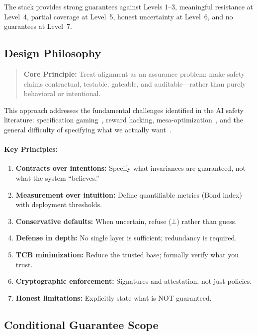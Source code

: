\documentclass[11pt,letterpaper]{article}
\theoremstyle{definition}
\theoremstyle{remark}
\begin{document}
The stack provides strong guarantees against Levels 1--3, meaningful resistance at Level~4, partial coverage at Level~5, honest uncertainty at Level~6, and no guarantees at Level~7.

\subsection{Design Philosophy}

\begin{quote}
\textbf{Core Principle:} Treat alignment as an assurance problem: make safety claims contractual, testable, gateable, and auditable---rather than purely behavioral or intentional.
\end{quote}

This approach addresses the fundamental challenges identified in the AI safety literature: specification gaming~\cite{krakovna2020}, reward hacking, mesa-optimization~\cite{hubinger2019}, and the general difficulty of specifying what we actually want~\cite{amodei2016,russell2019}.

\paragraph{Key Principles:}
\begin{enumerate}
\item \textbf{Contracts over intentions:} Specify what invariances are guaranteed, not what the system ``believes.''
\item \textbf{Measurement over intuition:} Define quantifiable metrics (Bond index) with deployment thresholds.
\item \textbf{Conservative defaults:} When uncertain, refuse ($\bot$) rather than guess.
\item \textbf{Defense in depth:} No single layer is sufficient; redundancy is required.
\item \textbf{TCB minimization:} Reduce the trusted base; formally verify what you trust.
\item \textbf{Cryptographic enforcement:} Signatures and attestation, not just policies.
\item \textbf{Honest limitations:} Explicitly state what is NOT guaranteed.
\end{enumerate}

\subsection{Conditional Guarantee Scope}
\end{document}
